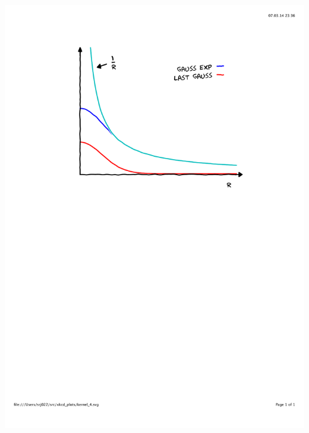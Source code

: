 \begin{frame}
\begin{columns}
\begin{column}{.45\textwidth}
{        \includegraphics[scale=0.4, clip, viewport = 110 450 490 800] {figures/kernel_4.pdf}}
\end{column}
\end{columns}
\end{frame}
